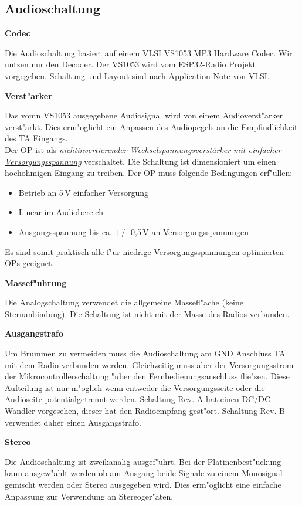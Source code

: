 \documentclass[ngerman,11pt,parskip=half] {scrartcl}
\begin{document}
\subsection{Audioschaltung} \label{sec:schaltung:audio}

\textbf{Codec}

Die Audioschaltung basiert auf einem VLSI VS1053 MP3 Hardware Codec. Wir nutzen nur den Decoder. Der VS1053 wird vom ESP32-Radio Projekt vorgegeben. Schaltung und Layout sind nach Application Note von VLSI.

\textbf{Verst"arker}

Das vomn VS1053 ausgegebene Audiosignal wird von einem Audioverst"arker verst"arkt. Dies erm"oglicht ein Anpassen des Audiopegels an die Empfindlichkeit des TA Eingangs. \\
Der OP ist als \emph{\href{https://www.mikrocontroller.net/articles/Operationsverst\%C3\%A4rker-Grundschaltungen\#Betrieb\_mit\_einfacher\_Versorgungsspannung}{nichtinvertierender Wechselspannungsverstärker mit einfacher Versorgungsspannung}} verschaltet. Die Schaltung ist dimensioniert um einen hochohmigen Eingang zu treiben. Der OP muss folgende Bedingungen erf"ullen:
\begin{itemize}
\item Betrieb an 5\,V einfacher Versorgung
\item Linear im Audiobereich
\item Ausgangsspannung bis ca. +/- 0,5\,V an Versorgungsspannungen
\end{itemize}
Es sind somit praktisch alle f"ur niedrige Versorgungsspannungen optimierten OPs geeignet.

\textbf{Massef"uhrung}

Die Analogschaltung verwendet die allgemeine Massefl"ache (keine Sternanbindung). Die Schaltung ist nicht mit der Masse des Radios verbunden.

\textbf{Ausgangstrafo}

Um Brummen zu vermeiden muss die Audioschaltung am GND Anschluss TA mit dem Radio verbunden werden. Gleichzeitig muss aber der Versorgungsstrom der Mikrocontrollerschaltung "uber den Fernbedienungsanschluss flie"sen. Diese Aufteilung ist nur m"oglich wenn entweder die Versorgungsseite oder die Audioseite potentialgetrennt werden. Schaltung Rev. A hat einen DC/DC Wandler vorgesehen, dieser hat den Radioempfang gest"ort. Schaltung Rev. B verwendet daher einen Ausgangstrafo.

\textbf{Stereo}

Die Audioschaltung ist zweikanalig ausgef"uhrt. Bei der Platinenbest"uckung kann ausgew"ahlt werden ob am Ausgang beide Signale zu einem Monosignal gemischt werden oder Stereo ausgegeben wird. Dies erm"oglicht eine einfache Anpassung zur Verwendung an Stereoger"aten.
\end{document}
